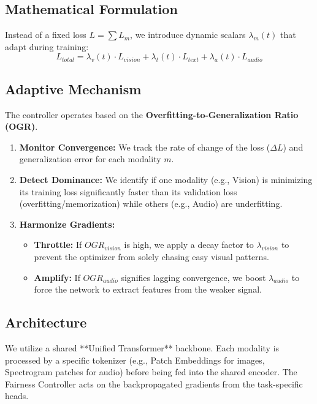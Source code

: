 \documentclass[11pt, a4paper]{article}
\begin{document}
\subsection{Mathematical Formulation}
Instead of a fixed loss $L = \sum L_m$, we introduce dynamic scalars $\lambda_m(t)$ that adapt during training:
\begin{equation}
    L_{total} = \lambda_v(t) \cdot L_{vision} + \lambda_t(t) \cdot L_{text} + \lambda_a(t) \cdot L_{audio}
\end{equation}

\subsection{Adaptive Mechanism}
The controller operates based on the \textbf{Overfitting-to-Generalization Ratio (OGR)}.
\begin{enumerate}
    \item \textbf{Monitor Convergence:} We track the rate of change of the loss ($\Delta L$) and generalization error for each modality $m$.
    \item \textbf{Detect Dominance:} We identify if one modality (e.g., Vision) is minimizing its training loss significantly faster than its validation loss (overfitting/memorization) while others (e.g., Audio) are underfitting.
    \item \textbf{Harmonize Gradients:}
    \begin{itemize}
        \item \textbf{Throttle:} If $OGR_{vision}$ is high, we apply a decay factor to $\lambda_{vision}$ to prevent the optimizer from solely chasing easy visual patterns.
        \item \textbf{Amplify:} If $OGR_{audio}$ signifies lagging convergence, we boost $\lambda_{audio}$ to force the network to extract features from the weaker signal.
    \end{itemize}
\end{enumerate}

\subsection{Architecture}
We utilize a shared **Unified Transformer** backbone. Each modality is processed by a specific tokenizer (e.g., Patch Embeddings for images, Spectrogram patches for audio) before being fed into the shared encoder. The Fairness Controller acts on the backpropagated gradients from the task-specific heads.
\end{document}
